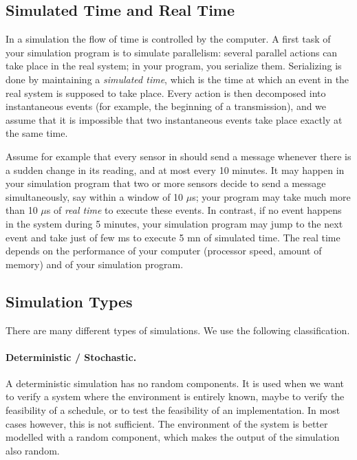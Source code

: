 \subsection{Simulated Time and Real Time} In a simulation the flow of
time is controlled by the computer. %
A first task of your simulation program is to simulate
parallelism: several parallel actions can take place in the real
system; in your program, you serialize them. Serializing is done
by maintaining a \emph{simulated time}, which is the time at which
an event in the real system is supposed to take place. Every
action is then decomposed into instantaneous events (for example,
the beginning of a transmission), and we assume that it is
impossible that two instantaneous events take place exactly at the
same time.

Assume for example that every sensor in  should
send a message whenever there is a sudden change in its reading,
and at most every 10 minutes. It may happen in your simulation
program that two or more sensors decide to send a message
simultaneously, say within a window of 10 $\mu$s; your program may
take much more than 10 $\mu$s of \emph{real time} to execute these
events. In contrast, if no event happens in the system during 5
minutes, your simulation program may jump to the next event and
take just of few ms to execute 5 mn of simulated time. The real
time depends on the performance of your computer (processor speed,
amount of memory) and of your simulation program.

\subsection{Simulation Types}
There are many different types of
simulations. We use the following classification.

\paragraph{Deterministic / Stochastic.}
A deterministic simulation has no random components. It is used
when we want to verify a system where the environment is entirely
known, maybe to verify the  feasibility of a schedule, or to test
the feasibility of an implementation.
%
In most cases however, this is not sufficient. The environment of
the system is better modelled with a random component, which makes
the output of the simulation also random.

